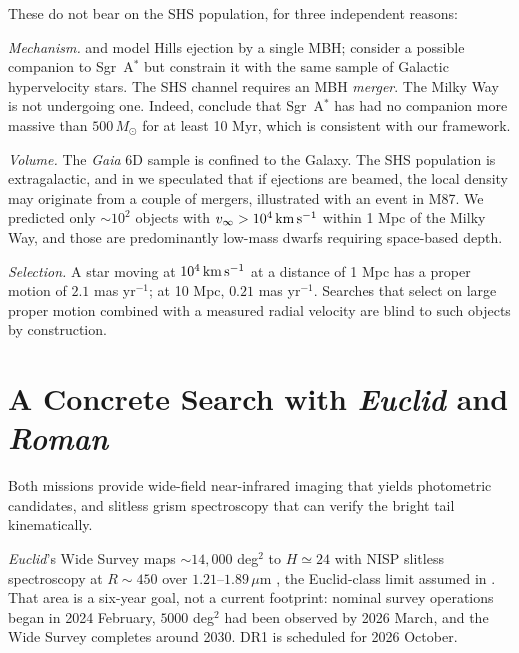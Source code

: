 \documentclass[twocolumn]{aastex701}
\newcommand{\vinf}{v_{\infty}}
\newcommand{\kms}{\,{\rm km\,s^{-1}}}
\newcommand{\Msun}{\,M_{\odot}}
\begin{document}
These do not bear on the SHS population, for three independent reasons:

\emph{Mechanism.} \citet{marchetti22} and \citet{verberne24} model Hills
ejection by a single MBH; \citet{evans23} consider a possible companion to
Sgr~A$^{*}$ but constrain it with the same sample of Galactic hypervelocity stars.
The SHS channel requires an MBH \emph{merger}. The Milky Way is not undergoing
one. Indeed, \citet{evans23} conclude that Sgr~A$^{*}$ has had no companion more
massive than $500\Msun$ for at least 10 Myr, which is consistent with our
framework.

\emph{Volume.} The \textit{Gaia} 6D sample is confined to the Galaxy. The SHS
population is extragalactic, and in  we speculated that if
ejections are beamed, the local density may originate from a couple of mergers,
illustrated with an event in M87. We predicted only $\sim\!10^{2}$ objects with
$\vinf>10^{4}\kms$ within 1 Mpc of the Milky Way, and those are predominantly
low-mass dwarfs requiring space-based depth.

\emph{Selection.} A star moving at $10^{4}\kms$ at a distance of 1 Mpc has a
proper motion of $2.1$ mas yr$^{-1}$; at 10 Mpc, $0.21$ mas yr$^{-1}$. Searches
that select on large proper motion combined with a measured radial velocity are
blind to such objects by construction.

\section{A Concrete Search with \textit{Euclid} and \textit{Roman}}
\label{sec:search}

Both missions provide wide-field
near-infrared imaging that yields photometric candidates, and slitless grism
spectroscopy that can verify the bright tail kinematically.

\textit{Euclid}'s Wide Survey maps $\sim\!14{,}000$ deg$^{2}$ to $H\simeq24$
with NISP slitless spectroscopy at $R\sim450$ over $1.21$--$1.89\,\mu$m
\citep{euclid25}, the Euclid-class limit assumed in .
That area is a six-year goal, not a current footprint: nominal survey
operations began in 2024 February, $5000$ deg$^{2}$ had been observed by
2026 March, and the Wide Survey completes around 2030. DR1 is scheduled for
2026 October.
\end{document}
